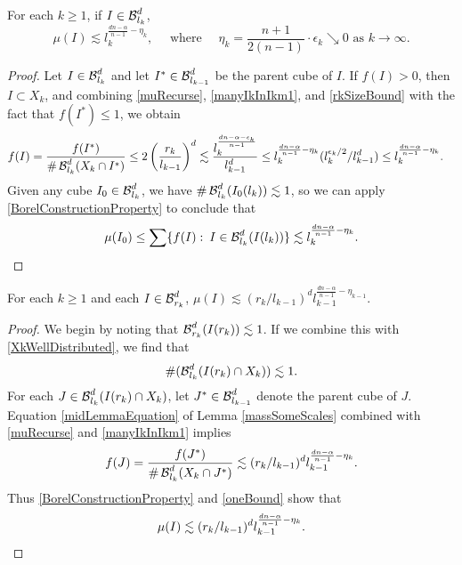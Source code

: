 \begin{lemma}\label{massSomeScales}
	For each $k \geq 1$, if $I \in \operatorname{\mathcal{B}}^d_{l_k}$,
	\[ \mu(I) \lesssim l_k^{\frac{dn-\alpha}{n-1}- \eta_k}, \quad \text{ where } \quad \eta_k = \frac{n+1}{2(n-1)} \cdot \epsilon_k \searrow 0 \text{ as } k \rightarrow \infty. \]
\end{lemma}
\begin{proof}
	Let $I \in \operatorname{\mathcal{B}}^d_{l_k}$ and let $I^* \in \operatorname{\mathcal{B}}^d_{l_{k-1}}$ be the parent cube of $I$. If $f(I) > 0$, then $I \subset X_k$, and combining \eqref{muRecurse}, \eqref{manyIkInIkm1}, and \eqref{rkSizeBound} with the fact that $f(I^*) \leq 1$, we obtain
	\begin{equation} \label{midLemmaEquation}
	\begin{split}
		f(I) &= \frac{f(I^*)}{\# \operatorname{\mathcal{B}}^d_{l_k}(X_k \cap I^*)} \leq 2 \left( \frac{r_k}{l_{k-1}} \right)^d \lesssim \frac{l_k^{\frac{dn - \alpha - \epsilon_k}{n-1}}}{l_{k-1}^d} \leq l_k^{\frac{dn - \alpha}{n-1} - \eta_k} (l_k^{\epsilon_k/2} / l_{k-1}^d) \leq l_k^{\frac{dn - \alpha}{n-1} - \eta_k}.
	\end{split}
	\end{equation}
	Given any cube $I_0 \in \operatorname{\mathcal{B}}^d_{l_k}$, we have $\# \operatorname{\mathcal{B}}^d_{l_k}(I_0(l_k)) \lesssim 1$, so we can apply \eqref{BorelConstructionProperty} to conclude that
	\[ \mu(I_0) \leq \sum \{ f(I) \operatorname{\colon} I \in \operatorname{\mathcal{B}}^d_{l_k}(I(l_k)) \} \lesssim l_k^{\frac{dn - \alpha}{n-1} - \eta_k}. \qedhere \]
\end{proof}

\begin{corollary}\label{muAtScaleRk}
	For each $k \geq 1$ and each $I \in \operatorname{\mathcal{B}}^d_{r_k}$, $\mu(I) \lesssim (r_k/l_{k-1})^d l_{k-1}^{\frac{dn-\alpha}{n-1}-\eta_{k-1}}$.
\end{corollary}
\begin{proof}
	We begin by noting that $\operatorname{\mathcal{B}}^d_{r_k}(I(r_k)) \lesssim 1$. If we combine this with \eqref{XkWellDistributed}, we find that
	\begin{equation} \label{oneBound}
		\#(\operatorname{\mathcal{B}}^d_{l_k}(I(r_k) \cap X_k)) \lesssim 1.
	\end{equation}
	For each $J \in \operatorname{\mathcal{B}}^d_{l_k}(I(r_k) \cap X_k)$, let $J^* \in \operatorname{\mathcal{B}}^d_{l_{k-1}}$ denote the parent cube of $J$. Equation \eqref{midLemmaEquation} of Lemma \ref{massSomeScales} combined with \eqref{muRecurse} and \eqref{manyIkInIkm1} implies
	\[ f(J) = \frac{f(J^*)}{\# \operatorname{\mathcal{B}}_{l_k}^d(X_k \cap J^*)} \lesssim (r_k/l_{k-1})^d l_{k-1}^{\frac{dn - \alpha}{n-1} - \eta_k}. \]
	Thus \eqref{BorelConstructionProperty} and \eqref{oneBound} show that
	\[ \mu(I) \lesssim (r_k/l_{k-1})^d l_{k-1}^{\frac{dn - \alpha}{n-1} - \eta_k}. \qedhere \]
\end{proof}

